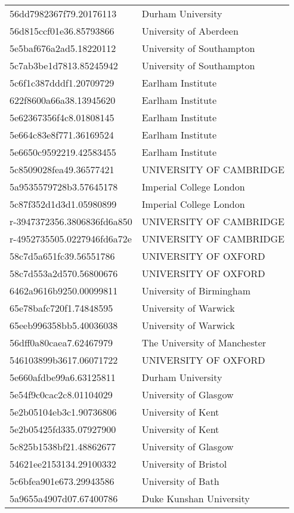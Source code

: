 \begin{tabular}{ll}
56dd7982367f79.20176113 & Durham University \\
56d815ccf01e36.85793866 & University of Aberdeen \\
5e5baf676a2ad5.18220112 & University of Southampton \\
5c7ab3be1d7813.85245942 & University of Southampton \\
5c6f1c387dddf1.20709729 & Earlham Institute \\
622f8600a66a38.13945620 & Earlham Institute \\
5e62367356f4c8.01808145 & Earlham Institute \\
5e664c83e8f771.36169524 & Earlham Institute \\
5e6650c9592219.42583455 & Earlham Institute \\
5c8509028fea49.36577421 & UNIVERSITY OF CAMBRIDGE \\
5a9535579728b3.57645178 & Imperial College London \\
5c87f352d1d3d1.05980899 & Imperial College London \\
r-3947372356.3806836fd6a850 & UNIVERSITY OF CAMBRIDGE \\
r-4952735505.0227946fd6a72e & UNIVERSITY OF CAMBRIDGE \\
58c7d5a651fc39.56551786 & UNIVERSITY OF OXFORD \\
58c7d553a2d570.56800676 & UNIVERSITY OF OXFORD \\
6462a9616b9250.00099811 & University of Birmingham \\
65e78bafc720f1.74848595 & University of Warwick \\
65eeb996358bb5.40036038 & University of Warwick \\
56dff0a80caea7.62467979 & The University of Manchester \\
546103899b3617.06071722 & UNIVERSITY OF OXFORD \\
5e660afdbe99a6.63125811 & Durham University \\
5e54f9c0cac2c8.01104029 & University of Glasgow \\
5e2b05104eb3c1.90736806 & University of Kent \\
5e2b05425fd335.07927900 & University of Kent \\
5c825b1538bf21.48862677 & University of Glasgow \\
54621ee2153134.29100332 & University of Bristol \\
5c6bfea901e673.29943586 & University of Bath \\
5a9655a4907d07.67400786 & Duke Kunshan University \\

\end{tabular}
